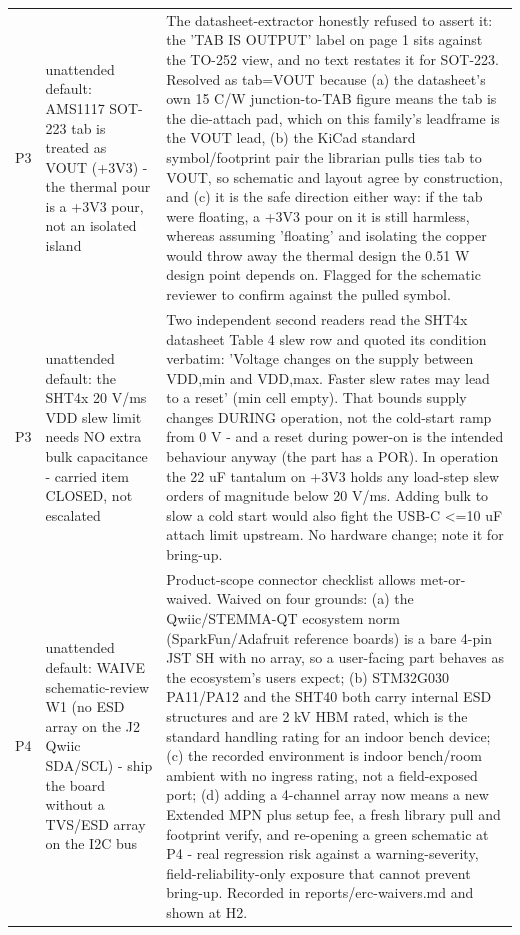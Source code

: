 \documentclass[11pt,a4paper]{article}
\begin{document}
{\begin{longtable}{lp{5.2cm}p{7.2cm}}
P3 & unattended default: AMS1117 SOT-223 tab is treated as VOUT (+3V3) - the thermal pour is a +3V3 pour, not an isolated island & The datasheet-extractor honestly refused to assert it: the 'TAB IS OUTPUT' label on page 1 sits against the TO-252 view, and no text restates it for SOT-223. Resolved as tab=VOUT because (a) the datasheet's own 15 C/W junction-to-TAB figure means the tab is the die-attach pad, which on this family's leadframe is the VOUT lead, (b) the KiCad standard symbol/footprint pair the librarian pulls ties tab to VOUT, so schematic and layout agree by construction, and (c) it is the safe direction either way: if the tab were floating, a +3V3 pour on it is still harmless, whereas assuming 'floating' and isolating the copper would throw away the thermal design the 0.51 W design point depends on. Flagged for the schematic reviewer to confirm against the pulled symbol. \\
P3 & unattended default: the SHT4x 20 V/ms VDD slew limit needs NO extra bulk capacitance - carried item CLOSED, not escalated & Two independent second readers read the SHT4x datasheet Table 4 slew row and quoted its condition verbatim: 'Voltage changes on the supply between VDD,min and VDD,max. Faster slew rates may lead to a reset' (min cell empty). That bounds supply changes DURING operation, not the cold-start ramp from 0 V - and a reset during power-on is the intended behaviour anyway (the part has a POR). In operation the 22 uF tantalum on +3V3 holds any load-step slew orders of magnitude below 20 V/ms. Adding bulk to slow a cold start would also fight the USB-C \textless{}=10 uF attach limit upstream. No hardware change; note it for bring-up. \\
P4 & unattended default: WAIVE schematic-review W1 (no ESD array on the J2 Qwiic SDA/SCL) - ship the board without a TVS/ESD array on the I2C bus & Product-scope connector checklist allows met-or-waived. Waived on four grounds: (a) the Qwiic/STEMMA-QT ecosystem norm (SparkFun/Adafruit reference boards) is a bare 4-pin JST SH with no array, so a user-facing part behaves as the ecosystem's users expect; (b) STM32G030 PA11/PA12 and the SHT40 both carry internal ESD structures and are 2 kV HBM rated, which is the standard handling rating for an indoor bench device; (c) the recorded environment is indoor bench/room ambient with no ingress rating, not a field-exposed port; (d) adding a 4-channel array now means a new Extended MPN plus setup fee, a fresh library pull and footprint verify, and re-opening a green schematic at P4 - real regression risk against a warning-severity, field-reliability-only exposure that cannot prevent bring-up. Recorded in reports/erc-waivers.md and shown at H2. \\

\end{longtable}}
\end{document}
